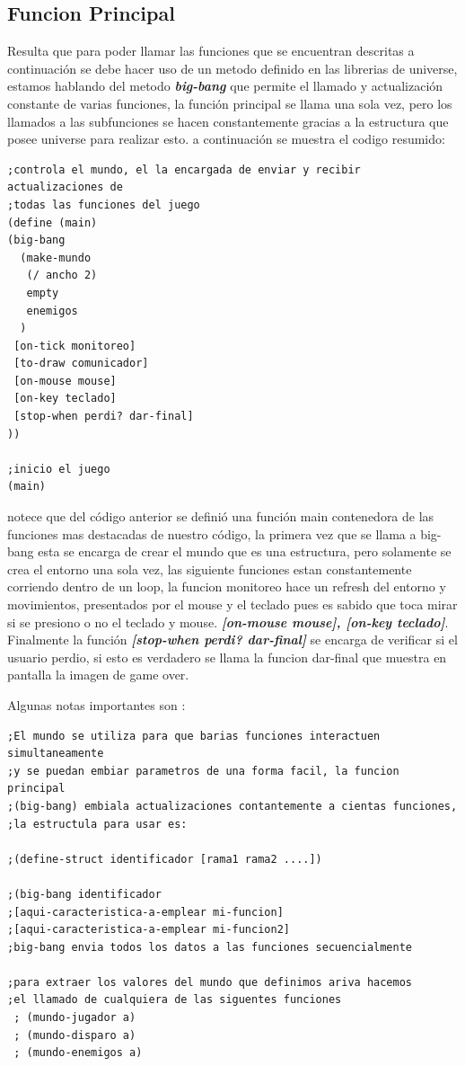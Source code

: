 \documentclass[a4paper]{article} %
\begin{document}
\subsection{Funcion Principal}
Resulta que para poder llamar las funciones que se encuentran descritas a continuación se debe hacer uso de un metodo definido en las librerias de universe, estamos hablando del metodo \textbf{\emph{big-bang}} que permite el llamado y actualización constante de varias funciones, la función principal se llama una sola vez, pero los llamados a las subfunciones se hacen constantemente gracias a la estructura que posee universe para realizar esto. a continuación se muestra el codigo resumido:
\begin{lstlisting}
;controla el mundo, el la encargada de enviar y recibir actualizaciones de 
;todas las funciones del juego
(define (main) 
(big-bang 
  (make-mundo 
   (/ ancho 2) 
   empty 
   enemigos
  )
 [on-tick monitoreo]
 [to-draw comunicador]
 [on-mouse mouse]
 [on-key teclado]
 [stop-when perdi? dar-final]
))

;inicio el juego
(main)
\end{lstlisting}
notece que del código anterior se definió una función main contenedora de las funciones mas destacadas de nuestro código, la primera vez que se llama a big-bang esta se encarga de crear el mundo que es una estructura, pero solamente se crea el entorno una sola vez, las siguiente funciones estan constantemente corriendo dentro de un loop, la funcion monitoreo hace un refresh del entorno y movimientos, presentados por el mouse y el teclado pues es sabido que toca mirar si se presiono o no el teclado y mouse. \textbf{\emph{[on-mouse mouse],  [on-key teclado]}}.
Finalmente la función  \textbf{\emph{[stop-when perdi? dar-final]}} se encarga de verificar si el usuario perdio, si esto es verdadero se llama la funcion dar-final que muestra en pantalla la imagen de game over.

Algunas notas importantes son :
\begin{lstlisting}
;El mundo se utiliza para que barias funciones interactuen simultaneamente 
;y se puedan embiar parametros de una forma facil, la funcion principal 
;(big-bang) embiala actualizaciones contantemente a cientas funciones,
;la estructula para usar es: 

;(define-struct identificador [rama1 rama2 ....])

;(big-bang identificador
;[aqui-caracteristica-a-emplear mi-funcion]
;[aqui-caracteristica-a-emplear mi-funcion2]
;big-bang envia todos los datos a las funciones secuencialmente

;para extraer los valores del mundo que definimos ariva hacemos 
;el llamado de cualquiera de las siguentes funciones
 ; (mundo-jugador a)
 ; (mundo-disparo a)
 ; (mundo-enemigos a)   
\end{lstlisting}
\end{document}
